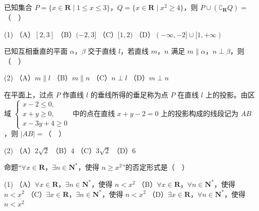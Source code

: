 \begin{question}
已知集合 \(P=\{x\in\mathbf{R}\mid 1\leqslant x\leqslant 3\}\)，\(Q=\{x\in\mathbf{R}\mid x^{2}\geqslant 4\}\)，则 \(P\cup(\complement_{\mathbf{R}}Q)=\)（　）

\begin{gkopts}(1)
\task （A）\([2,3]\)
\task （B）\((-2,3]\)
\task （C）\([1,2)\)
\task （D）\((-\infty,-2]\cup[1,+\infty)\)
\end{gkopts}

\end{question}
\begin{question}
已知互相垂直的平面 \(\alpha\)，\(\beta\) 交于直线 \(l\)，若直线 \(m\)，\(n\) 满足 \(m\parallel\alpha\)，\(n\perp\beta\)，则（　）

\begin{gkopts}(2)
\task （A）\(m\parallel l\)
\task （B）\(m\parallel n\)
\task （C）\(n\perp l\)
\task （D）\(m\perp n\)
\end{gkopts}

\end{question}
\begin{question}
在平面上，过点 \(P\) 作直线 \(l\) 的垂线所得的垂足称为点 \(P\) 在直线 \(l\) 上的投影。由区域 \(\begin{cases} x-2\leqslant 0, \\ x+y\geqslant 0, \\ x-3y+4\geqslant 0 \end{cases}\) 中的点在直线 \(x+y-2=0\) 上的投影构成的线段记为 \(AB\)，则 \(|AB|=\)（　）

\begin{gkopts}(2)
\task （A）\(2\sqrt{2}\)
\task （B）4
\task （C）\(3\sqrt{2}\)
\task （D）6
\end{gkopts}

\end{question}
\begin{question}
命题“\(\forall x\in\mathbf{R}\)，\(\exists n\in\mathbf{N}^{*}\)，使得 \(n\geqslant x^{2}\)”的否定形式是（　）

\begin{gkopts}(1)
\task （A）\(\forall x\in\mathbf{R}\)，\(\exists n\in\mathbf{N}^{*}\)，使得 \(n<x^{2}\)
\task （B）\(\forall x\in\mathbf{R}\)，\(\forall n\in\mathbf{N}^{*}\)，使得 \(n<x^{2}\)
\task （C）\(\exists x\in\mathbf{R}\)，\(\exists n\in\mathbf{N}^{*}\)，使得 \(n<x^{2}\)
\task （D）\(\exists x\in\mathbf{R}\)，\(\forall n\in\mathbf{N}^{*}\)，使得 \(n<x^{2}\)
\end{gkopts}

\end{question}
